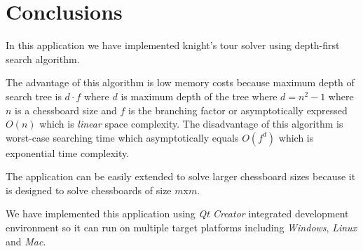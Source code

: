 \newpage

\section{Conclusions}

In this application we have implemented knight's tour solver using depth-first search algorithm.

The advantage of this algorithm is low memory costs because maximum depth of search tree is $d \cdot f$ where $d$ is maximum depth of the tree where $d = n^2 - 1$ where $n$ is a chessboard size and $f$ is the branching factor or asymptotically expressed $O(n)$ which is \emph{linear} space complexity. The disadvantage of this algorithm is worst-case searching time which asymptotically equals $O(f^d)$ which is exponential time complexity.

The application can be easily extended to solve larger chessboard sizes because it is designed to solve chessboards of size $m$x$m$.

We have implemented this application using \emph{Qt Creator} integrated development environment so it can run on multiple target platforms including \emph{Windows}, \emph{Linux} and \emph{Mac}.